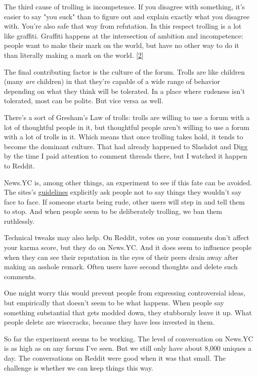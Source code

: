 The third cause of trolling is incompetence.  If you disagree with
something, it's easier to say "you suck" than to figure out and
explain exactly what you disagree with.  You're also safe that way
from refutation.  In this respect trolling is a lot like graffiti.
Graffiti happens at the intersection of ambition and incompetence:
people want to make their mark on the world, but have no other way
to do it than literally making a mark on the world.
[\href{\#f2n}{2}]

The final contributing factor is the culture of the forum.  Trolls
are like children (many \emph{are} children) in that they're capable of
a wide range of behavior depending on what they think will be
tolerated.  In a place where rudeness isn't tolerated, most can be
polite.  But vice versa as well.

There's a sort of Gresham's Law of trolls: trolls are willing to
use a forum with a lot of thoughtful people in it, but thoughtful
people aren't willing to use a forum with a lot of trolls in it.
Which means that once trolling takes hold, it tends to become the
dominant culture.  That had already happened to Slashdot and Digg by
the time I paid attention to comment threads there, but I watched
it happen to Reddit.

News.YC is, among other things, an experiment to see if this fate
can be avoided.  The sites's \href{http://ycombinator.com/newsguidelines.html}{guidelines}
explicitly ask people not to say things they wouldn't say face to
face.  If someone starts being rude, other users will step in and
tell them to stop.  And when people seem to be deliberately trolling,
we ban them ruthlessly.

Technical tweaks may also help.  On Reddit, votes on your comments
don't affect your karma score, but they do on News.YC.  And it does
seem to influence people when they can see their reputation in the
eyes of their peers drain away after making an asshole remark.
Often users have second thoughts and delete such comments.

One might worry this would prevent people from expressing controversial
ideas, but empirically that doesn't seem to be what happens.  When
people say something substantial that gets modded down, they
stubbornly leave it up.  What people delete are wisecracks, because
they have less invested in them.

So far the experiment seems to be working.  The level of conversation
on News.YC is as high as on any forum I've seen.  But we still only
have about 8,000 uniques a day.  The conversations on Reddit were
good when it was that small.  The challenge is whether we can keep
things this way.

